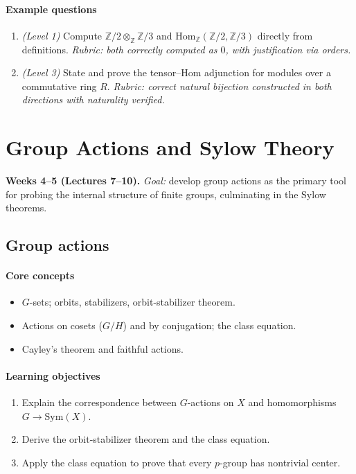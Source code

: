 \documentclass{article}
\begin{document}
\paragraph{Example questions}
\begin{enumerate}[nosep]
  \item \emph{(Level 1)} Compute $\mathbb{Z}/2 \otimes_{\mathbb{Z}} \mathbb{Z}/3$ and $\mathrm{Hom}_{\mathbb{Z}}(\mathbb{Z}/2,\mathbb{Z}/3)$ directly from definitions. \emph{Rubric: both correctly computed as $0$, with justification via orders.}
  \item \emph{(Level 3)} State and prove the tensor--Hom adjunction for modules over a commutative ring $R$. \emph{Rubric: correct natural bijection constructed in both directions with naturality verified.}
\end{enumerate}

\section{Group Actions and Sylow Theory}
\textbf{Weeks 4--5 (Lectures 7--10).} \emph{Goal:} develop group actions as the primary tool for probing the internal structure of finite groups, culminating in the Sylow theorems.

\subsection{Group actions}
\paragraph{Core concepts}
\begin{itemize}[nosep]
  \item $G$-sets; orbits, stabilizers, orbit-stabilizer theorem.
  \item Actions on cosets ($G/H$) and by conjugation; the class equation.
  \item Cayley's theorem and faithful actions.
\end{itemize}
\paragraph{Learning objectives}
\begin{enumerate}[nosep]
  \item Explain the correspondence between $G$-actions on $X$ and homomorphisms $G \to \mathrm{Sym}(X)$.
  \item Derive the orbit-stabilizer theorem and the class equation.
  \item Apply the class equation to prove that every $p$-group has nontrivial center.
\end{enumerate}
\end{document}
